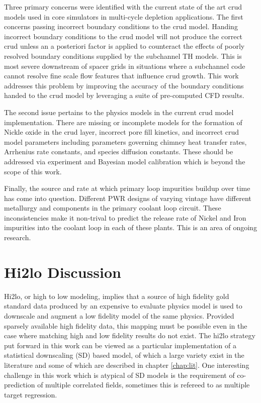Three primary concerns were identified with the current state of the art crud models used in core simulators in multi-cycle depletion applications.
The first concerns passing incorrect boundary conditions to the crud model.  Handing incorrect boundary conditions to the crud model will not produce the correct crud unless an a posteriori factor is applied to counteract the effects of poorly resolved boundary conditions supplied by the subchannel TH models.  This is most severe downstream of spacer grids in situations where a subchannel code cannot resolve fine scale flow features that influence crud growth.  This work  addresses this problem by improving the accuracy of the boundary conditions handed to the crud model by leveraging a suite of pre-computed CFD results.

The second issue pertains to the physics models in the current crud model implementation.  There are missing or incomplete models for the formation of Nickle oxide in the crud layer, incorrect pore fill kinetics, and incorrect crud model parameters including parameters governing chimney heat transfer rates, Arrhenius rate constants, and species diffusion constants. These should be addressed via experiment and Bayesian model calibration which is beyond the scope of this work.

Finally, the source and rate at which primary loop impurities buildup over time has come into question.  Different PWR designs of varying vintage have different metallurgy and components in the primary coolant loop circuit.  These inconsistencies make it non-trival to predict the release rate of Nickel and Iron impurities into the coolant loop in each of these plants.  This is an area of ongoing research.



\section{Hi2lo Discussion}

Hi2lo, or high to low modeling, implies that a source of high fidelity gold standard data produced by an expensive to evaluate physics model is used to downscale and augment a low fidelity model of the same physics.
Provided sparsely available high fidelity data, this mapping must be possible even in the case where matching high and low fidelity results do not exist.  The hi2lo strategy put forward in this work can be viewed as a particular implementation of a statistical downscaling (SD) based model, of which a large variety exist in the literature and some of which are described in chapter \ref{chap:lit}.  One interesting challenge in this work which is atypical of SD models is the requirement of co-prediction of multiple correlated fields, sometimes this is refereed to as multiple target regression.

